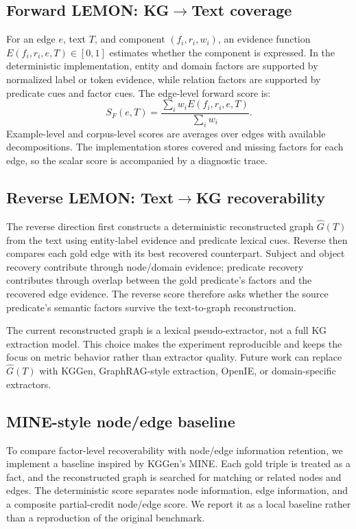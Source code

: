 

\subsection{Forward LEMON: KG$\rightarrow$Text coverage}
For an edge \(e\), text \(T\), and component \((f_i,r_i,w_i)\), an evidence function \(E(f_i,r_i,e,T)\in[0,1]\) estimates whether the component is expressed. In the deterministic implementation, entity and domain factors are supported by normalized label or token evidence, while relation factors are supported by predicate cues and factor cues. The edge-level forward score is:
\[
S_F(e,T)=\frac{\sum_i w_i E(f_i,r_i,e,T)}{\sum_i w_i}.
\]
Example-level and corpus-level scores are averages over edges with available decompositions. The implementation stores covered and missing factors for each edge, so the scalar score is accompanied by a diagnostic trace.

\subsection{Reverse LEMON: Text$\rightarrow$KG recoverability}
The reverse direction first constructs a deterministic reconstructed graph \(\hat{G}(T)\) from the text using entity-label evidence and predicate lexical cues. Reverse \lemonscore{} then compares each gold edge with its best recovered counterpart. Subject and object recovery contribute through node/domain evidence; predicate recovery contributes through overlap between the gold predicate's factors and the recovered edge evidence. The reverse score therefore asks whether the source predicate's semantic factors survive the text-to-graph reconstruction.

The current reconstructed graph is a lexical pseudo-extractor, not a full KG extraction model. This choice makes the experiment reproducible and keeps the focus on metric behavior rather than extractor quality. Future work can replace \(\hat{G}(T)\) with KGGen, GraphRAG-style extraction, OpenIE, or domain-specific extractors.

\subsection{MINE-style node/edge baseline}
To compare factor-level recoverability with node/edge information retention, we implement a \minebase{} baseline inspired by KGGen's MINE. Each gold triple is treated as a fact, and the reconstructed graph is searched for matching or related nodes and edges. The deterministic score separates node information, edge information, and a composite partial-credit node/edge score. We report it as a local baseline rather than a reproduction of the original benchmark.

